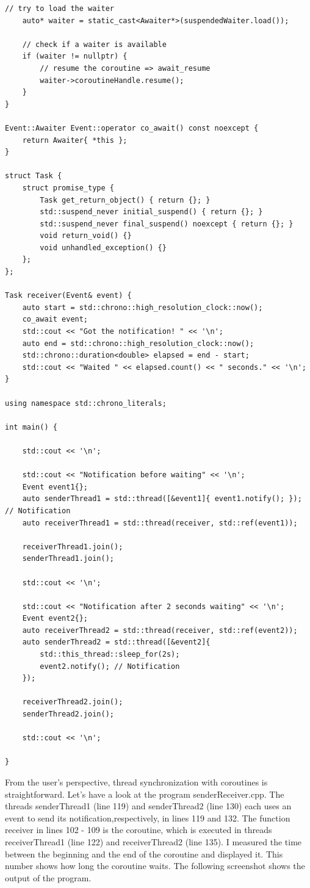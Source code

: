 \begin{lstlisting}[style=styleCXX]
	// try to load the waiter
	auto* waiter = static_cast<Awaiter*>(suspendedWaiter.load());
	
	// check if a waiter is available
	if (waiter != nullptr) {
		// resume the coroutine => await_resume
		waiter->coroutineHandle.resume();
	}
}

Event::Awaiter Event::operator co_await() const noexcept {
	return Awaiter{ *this };
}

struct Task {
	struct promise_type {
		Task get_return_object() { return {}; }
		std::suspend_never initial_suspend() { return {}; }
		std::suspend_never final_suspend() noexcept { return {}; }
		void return_void() {}
		void unhandled_exception() {}
	};
};

Task receiver(Event& event) {
	auto start = std::chrono::high_resolution_clock::now();
	co_await event;
	std::cout << "Got the notification! " << '\n';
	auto end = std::chrono::high_resolution_clock::now();
	std::chrono::duration<double> elapsed = end - start;
	std::cout << "Waited " << elapsed.count() << " seconds." << '\n';
}

using namespace std::chrono_literals;

int main() {
	
	std::cout << '\n';
	
	std::cout << "Notification before waiting" << '\n';
	Event event1{};
	auto senderThread1 = std::thread([&event1]{ event1.notify(); }); // Notification
	auto receiverThread1 = std::thread(receiver, std::ref(event1));
	
	receiverThread1.join();
	senderThread1.join();
	
	std::cout << '\n';
	
	std::cout << "Notification after 2 seconds waiting" << '\n';
	Event event2{};
	auto receiverThread2 = std::thread(receiver, std::ref(event2));
	auto senderThread2 = std::thread([&event2]{
		std::this_thread::sleep_for(2s);
		event2.notify(); // Notification
	});
	
	receiverThread2.join();
	senderThread2.join();
	
	std::cout << '\n';
	
}
\end{lstlisting}

From the user’s perspective, thread synchronization with coroutines is straightforward. Let’s have a look at the program senderReceiver.cpp. The threads senderThread1 (line 119) and senderThread2 (line 130) each uses an event to send its notification,respectively, in lines 119 and 132. The function receiver in lines 102 - 109 is the coroutine, which is executed in threads receiverThread1 (line 122) and receiverThread2 (line 135). I measured the time between the beginning and the end of the coroutine and displayed it. This number shows how long the coroutine waits. The following screenshot shows the output of the program.

